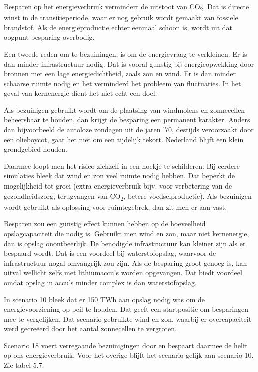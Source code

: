 \documentclass[
  11pt,
  a4paper,
]{book}
\begin{document}
Besparen op het energieverbruik vermindert de uitstoot van CO\textsubscript{2}. Dat is directe winst in de transitieperiode, waar er nog gebruik wordt gemaakt van fossiele brandstof. Als de energieproductie echter eenmaal schoon is, wordt uit dat oogpunt besparing overbodig.

Een tweede reden om te bezuiningen, is om de energievraag te verkleinen. Er is dan minder infrastructuur nodig. Dat is vooral gunstig bij energieopwekking door bronnen met een lage energiedichtheid, zoals zon en wind. Er is dan minder schaarse ruimte nodig en het verminderd het probleem van fluctuaties. In het geval van kernenergie dient het niet echt een doel.

Als bezuinigen gebruikt wordt om de plaatsing van windmolens en zonnecellen beheersbaar te houden, dan krijgt de besparing een permanent karakter. Anders dan bijvoorbeeld de autoloze zondagen uit de jaren '70, destijds veroorzaakt door een olieboycot, gaat het niet om een tijdelijk tekort. Nederland blijft een klein grondgebied houden.

Daarmee loopt men het risico zichzelf in een hoekje te schilderen. Bij eerdere simulaties bleek dat wind en zon veel ruimte nodig hebben. Dat beperkt de mogelijkheid tot groei (extra energieverbruik bijv. voor verbetering van de gezondheidszorg, terugvangen van CO\textsubscript{2}, betere voedselproductie). Als bezuinigen wordt gebruikt als oplossing voor ruimtegebrek, dan zit men er aan vast.

\bigskip\noindent
Besparen zou een gunstig effect kunnen hebben op de hoeveelheid opslagcapaciteit die nodig is. Gebruikt men wind en zon, maar niet kernenergie, dan is opslag onontbeerlijk. De benodigde infrastructuur kan kleiner zijn als er bespaard wordt. Dat is een voordeel bij waterstofopslag, waarvoor de infrastructuur nogal omvangrijk zou zijn. Als de besparing groot genoeg is, kan uitval wellicht zelfs met lithiumaccu's worden opgevangen. Dat biedt voordeel omdat opslag in accu's minder complex is dan waterstofopslag.

In scenario 10 bleek dat er 150 TWh aan opslag nodig was om de energievoorziening op peil te houden. Dat geeft een startpositie om besparingen mee te vergelijken. Dat scenario gebruikte wind en zon, waarbij er overcapaciteit werd gecreëerd door het aantal zonnecellen te vergroten.

Scenario 18 voert verregaande bezuinigingen door en bespaart daarmee de helft op ons energieverbruik. Voor het overige blijft het scenario gelijk aan scenario 10. Zie tabel 5.7.
\end{document}
